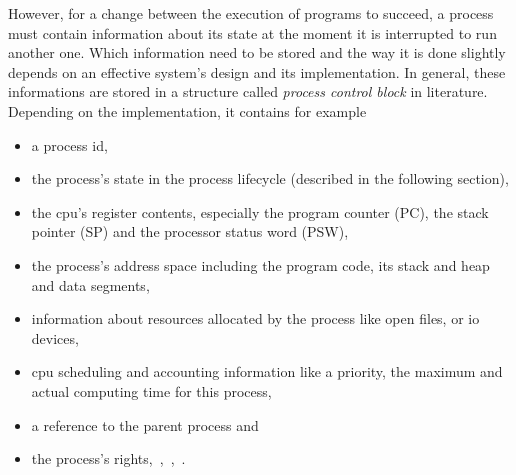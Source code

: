 However, for a change between the execution of programs to succeed, a process must contain information about its state at the moment it is interrupted to run another one.
Which information need to be stored and the way it is done slightly depends on an effective system's design and its implementation.
In general, these informations are stored in a structure called \textit{process control block} in literature\cite{tanenbaum-modern-operating-systems}.
Depending on the implementation, it contains for example
\begin{itemize}
    \item a process id, 
    \item the process's state in the process lifecycle (described in the following section),
    \item the \ac{cpu}'s register contents, especially the program counter (PC), the stack pointer (SP) and the processor status word (PSW),
    \item the process's address space including the program code, its stack and heap and data segments, 
    \item information about resources allocated by the process like open files, or \ac{io} devices,
    \item \ac{cpu} scheduling and accounting information like a priority, the maximum and actual computing time for this process,
    \item a reference to the parent process and
    \item the process's rights\cite{tanenbaum-modern-operating-systems},~\cite{glatz2015betriebssysteme},~\cite{achilles2006betriebssysteme},~\cite{silberschatz2009operating}.
\end{itemize}

